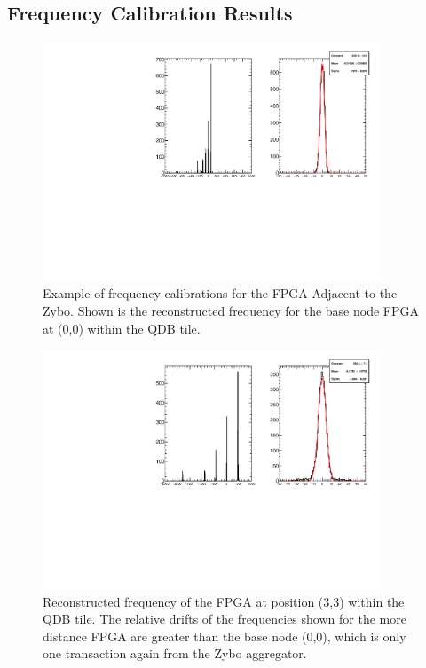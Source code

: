 \subsection{Frequency Calibration Results}





\begin{figure}[]
\centering
\includegraphics[width=0.9\textwidth]{images/(0,0).pdf}
\caption{Example of frequency calibrations for the FPGA Adjacent to the Zybo.
Shown is the reconstructed frequency for the base node FPGA at (0,0) within the QDB tile.
}
\end{figure}

\begin{figure}[]
\centering
\includegraphics[width=0.9\textwidth]{images/(3,3).pdf}
\caption{Reconstructed frequency of the FPGA at position (3,3) within the QDB tile.
The relative drifts of the frequencies shown for the more distance FPGA are greater than the base node (0,0), which is only one transaction again from the Zybo aggregator.
}
\end{figure}

